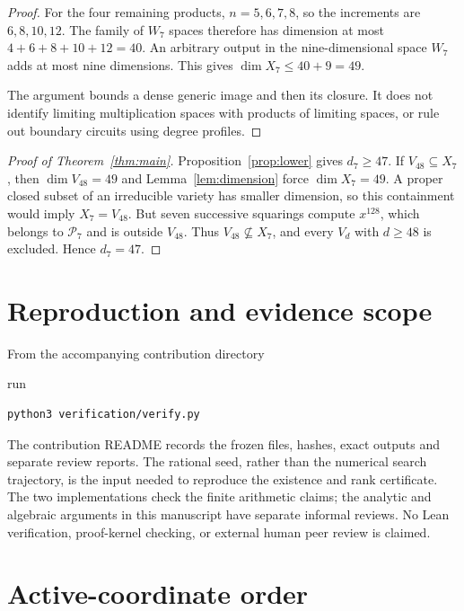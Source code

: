 \documentclass[11pt]{article}
\begin{document}
\begin{proof}
For the four remaining products, $n=5,6,7,8$, so the increments are
$6,8,10,12$. The family of $W_7$ spaces therefore has dimension at
most $4+6+8+10+12=40$. An arbitrary output in the nine-dimensional
space $W_7$ adds at most nine dimensions. This gives
$\dim X_7\le40+9=49$.

The argument bounds a dense generic image and then its closure. It
does not identify limiting multiplication spaces with products of
limiting spaces, or rule out boundary circuits using degree profiles.
\end{proof}

\begin{proof}[Proof of Theorem~\ref{thm:main}]
Proposition~\ref{prop:lower} gives $d_7\ge47$. If $V_{48}\subseteq X_7$,
then $\dim V_{48}=49$ and Lemma~\ref{lem:dimension} force
$\dim X_7=49$. A proper closed subset of an irreducible variety has
smaller dimension, so this containment would imply $X_7=V_{48}$.
But seven successive squarings compute $x^{128}$, which belongs to
$\mathcal P_7$ and is outside $V_{48}$. Thus $V_{48}\nsubseteq X_7$,
and every $V_d$ with $d\ge48$ is excluded. Hence $d_7=47$.
\end{proof}

\section{Reproduction and evidence scope}\label{sec:reproduction}

From the accompanying contribution directory
\begin{center}
\end{center}
run
\begin{verbatim}
python3 verification/verify.py
\end{verbatim}
The contribution README records the frozen files, hashes, exact outputs
and separate review reports. The rational seed, rather than the numerical
search trajectory, is the input needed to reproduce the existence and
rank certificate. The two implementations check the finite arithmetic
claims; the analytic and algebraic arguments in this manuscript have
separate informal reviews. No Lean verification, proof-kernel checking,
or external human peer review is claimed.

\appendix
\section{Active-coordinate order}\label{app:indices}
\end{document}
